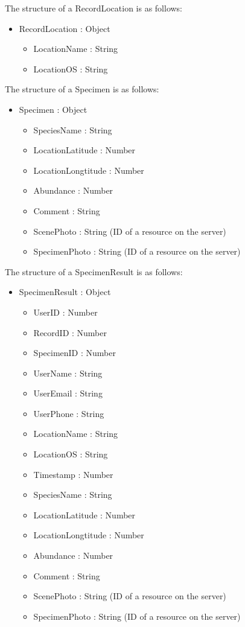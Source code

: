         The structure of a RecordLocation is as follows:
        \begin{itemize}
        	\item RecordLocation : Object
        	\begin{itemize}
        		\item LocationName : String 
        		\item LocationOS : String
        	\end{itemize}
        \end{itemize}

        The structure of a Specimen is as follows:
        \begin{itemize}
            \item Specimen : Object
            \begin{itemize}
                \item SpeciesName : String
                \item LocationLatitude : Number
                \item LocationLongtitude : Number
                \item Abundance : Number
                \item Comment : String
                \item ScenePhoto : String (ID of a resource on the server)
                \item SpecimenPhoto : String (ID of a resource on the server)
            \end{itemize}
        \end{itemize}
        
        The structure of a SpecimenResult is as follows:
        \begin{itemize}
        	\item SpecimenResult : Object
        	\begin{itemize}
	        	\item UserID : Number
	        	\item RecordID : Number
	        	\item SpecimenID : Number
        		\item UserName : String
        		\item UserEmail : String
        		\item UserPhone : String
        		\item LocationName : String
        		\item LocationOS : String
        		\item Timestamp : Number
        		\item SpeciesName : String
        		\item LocationLatitude : Number
        		\item LocationLongtitude : Number
        		\item Abundance : Number
        		\item Comment : String
        		\item ScenePhoto : String (ID of a resource on the server)
        		\item SpecimenPhoto : String (ID of a resource on the server)
        	\end{itemize}
        \end{itemize}

